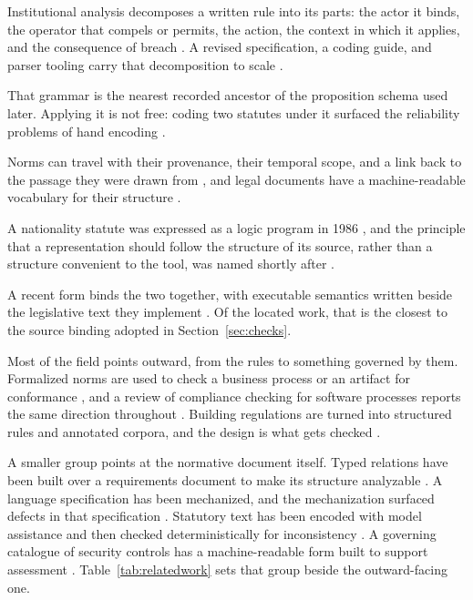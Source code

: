 Institutional analysis decomposes a written rule into its parts: the actor it binds, the operator that compels or permits, the action, the context in which it applies, and the consequence of breach \citep{crawford1995}. A revised specification, a coding guide, and parser tooling carry that decomposition to scale \citep{frantz2021, frantz2020codebook, frantz2025parser}.

That grammar is the nearest recorded ancestor of the proposition schema used later. Applying it is not free: coding two statutes under it surfaced the reliability problems of hand encoding \citep{basurto2010}.

Norms can travel with their provenance, their temporal scope, and a link back to the passage they were drawn from \citep{legalruleml}, and legal documents have a machine-readable vocabulary for their structure \citep{akomanotoso, palmirani2011}.

A nationality statute was expressed as a logic program in 1986 \citep{sergot1986}, and the principle that a representation should follow the structure of its source, rather than a structure convenient to the tool, was named shortly after \citep{benchcapon1992}.

A recent form binds the two together, with executable semantics written beside the legislative text they implement \citep{catala2021}. Of the located work, that is the closest to the source binding adopted in Section~\ref{sec:checks}.

Most of the field points outward, from the rules to something governed by them. Formalized norms are used to check a business process or an artifact for conformance \citep{governatori2016, hashmi2015}, and a review of compliance checking for software processes reports the same direction throughout \citep{castellanos2022}. Building regulations are turned into structured rules and annotated corpora, and the design is what gets checked \citep{hettiarachchi2025}.

A smaller group points at the normative document itself. Typed relations have been built over a requirements document to make its structure analyzable \citep{grosser2022}. A language specification has been mechanized, and the mechanization surfaced defects in that specification \citep{watt2018}. Statutory text has been encoded with model assistance and then checked deterministically for inconsistency \citep{yadamsuren2026}. A governing catalogue of security controls has a machine-readable form built to support assessment \citep{piez2019}. Table~\ref{tab:relatedwork} sets that group beside the outward-facing one.

